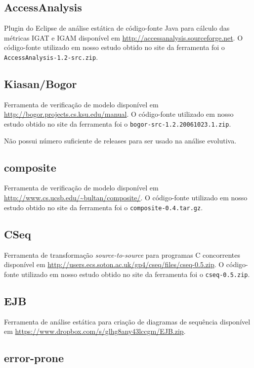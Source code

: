 \subsection{AccessAnalysis}

Plugin do Eclipse de análise estática de código-fonte Java
para cálculo das métricas IGAT e IGAM
disponível em \url{http://accessanalysis.sourceforge.net}. O código-fonte
utilizado em nosso estudo obtido no site da ferramenta foi o
\texttt{AccessAnalysis-1.2-src.zip}.

\subsection{Kiasan/Bogor}

Ferramenta de verificação de modelo disponível em
\url{http://bogor.projects.cs.ksu.edu/manual}. O código-fonte utilizado em
nosso estudo obtido no site da ferramenta foi o
\texttt{bogor-src-1.2.20061023.1.zip}.

Não possui número suficiente de releases para ser usado na análise evolutiva.

\subsection{composite}

Ferramenta de verificação de modelo disponível em
\url{http://www.cs.ucsb.edu/~bultan/composite/}. O código-fonte utilizado em
nosso estudo obtido no site da ferramenta foi o \texttt{composite-0.4.tar.gz}.

\subsection{CSeq}

Ferramenta de transformação {\it source-to-source} para programas C
concorrentes disponível em
\url{http://users.ecs.soton.ac.uk/gp4/cseq/files/cseq-0.5.zip}. O código-fonte
utilizado em nosso estudo obtido no site da ferramenta foi o
\texttt{cseq-0.5.zip}.

\subsection{EJB}

Ferramenta de análise estática para criação de diagramas de sequência
disponível em
\url{https://www.dropbox.com/s/glhg8any43lccgm/EJB.zip}.

\subsection{error-prone}

